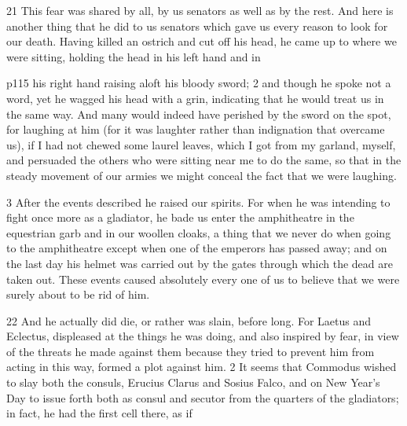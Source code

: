 21
This fear was shared by all, by us senators as well as by the rest. And here is another thing that he did to us senators which gave us every reason to look for our death. Having killed an ostrich and cut off his head, he came up to where we were sitting, holding the head in his left hand and in

p115 his right hand raising aloft his bloody sword; 2 and though he spoke not a word, yet he wagged his head with a grin, indicating that he would treat us in the same way. And many would indeed have perished by the sword on the spot, for laughing at him (for it was laughter rather than indignation that overcame us), if I had not chewed some laurel leaves, which I got from my garland, myself, and persuaded the others who were sitting near me to do the same, so that in the steady movement of our armies we might conceal the fact that we were laughing.

3
After the events described he raised our spirits. For when he was intending to fight once more as a gladiator, he bade us enter the amphitheatre in the equestrian garb and in our woollen cloaks, a thing that we never do when going to the amphitheatre except when one of the emperors has passed away; and on the last day his helmet was carried out by the gates through which the dead are taken out. These events caused absolutely every one of us to believe that we were surely about to be rid of him.

22
And he actually did die, or rather was slain, before long. For Laetus and Eclectus, displeased at the things he was doing, and also inspired by fear, in view of the threats he made against them because they tried to prevent him from acting in this way, formed a plot against him. 2 It seems that Commodus wished to slay both the consuls, Erucius Clarus and Sosius Falco, and on New Year's Day to issue forth both as consul and secutor from the quarters of the gladiators; in fact, he had the first cell there, as if

